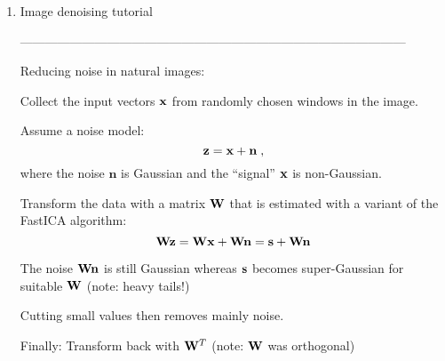 \documentclass[10pt]{article}
\begin{document}
\begin{enumerate}
\vspace{2mm}

\vspace{2cm}
\item Image denoising tutorial

---------------------------------------------------------------------------------------------

Reducing noise in natural images:

Collect the input vectors ${\bf x}$ from randomly chosen windows in the
image.

Assume a noise model:
\begin{displaymath}
{\bf z} = {\bf x} + \mathbf{n} \; ,
\end{displaymath}
where the noise $\mathbf{n}$ is Gaussian and the ``signal'' ${\bf x}$ is
non-Gaussian.

Transform the data with a matrix ${\bf W}$ that is estimated with a variant 
of the FastICA algorithm:
\begin{displaymath}
{\bf Wz} = {\bf Wx} + {\bf Wn} = {\bf s} + {\bf Wn}
\end{displaymath}

The noise ${\bf Wn}$ is still Gaussian whereas ${\bf s}$ becomes
super-Gaussian for suitable ${\bf W}$ (note: heavy tails!)

Cutting small values then removes mainly noise.

Finally: Transform back with ${\bf W}^T$ (note: ${\bf W}$ was orthogonal)







\end{enumerate}
\end{document}
